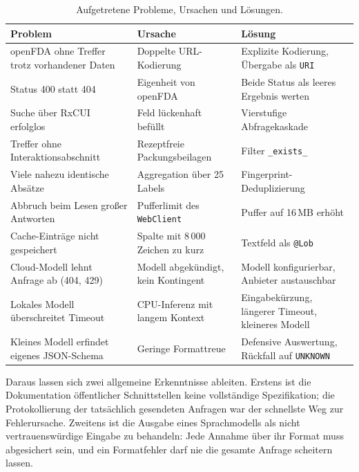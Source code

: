 \begin{table}[htbp]
  \centering
  \small
  \caption{Aufgetretene Probleme, Ursachen und Lösungen.}
  \label{tab:probleme}
  \begin{tabularx}{\textwidth}{@{}L L L@{}}
    \toprule
    Problem & Ursache & Lösung \\
    \midrule
    openFDA ohne Treffer trotz vorhandener Daten & Doppelte URL-Kodierung & Explizite Kodierung, Übergabe als \texttt{URI} \\
    Status 400 statt 404 & Eigenheit von openFDA & Beide Status als leeres Ergebnis werten \\
    Suche über RxCUI erfolglos & Feld lückenhaft befüllt & Vierstufige Abfragekaskade \\
    Treffer ohne Interaktionsabschnitt & Rezeptfreie Packungsbeilagen & Filter \texttt{\_exists\_} \\
    Viele nahezu identische Absätze & Aggregation über 25 Labels & Fingerprint-Deduplizierung \\
    Abbruch beim Lesen großer Antworten & Pufferlimit des \texttt{WebClient} & Puffer auf 16\,MB erhöht \\
    Cache-Einträge nicht gespeichert & Spalte mit 8\,000 Zeichen zu kurz & Textfeld als \texttt{@Lob} \\
    Cloud-Modell lehnt Anfrage ab (404, 429) & Modell abgekündigt, kein Kontingent & Modell konfigurierbar, Anbieter austauschbar \\
    Lokales Modell überschreitet Timeout & CPU-Inferenz mit langem Kontext & Eingabekürzung, längerer Timeout, kleineres Modell \\
    Kleines Modell erfindet eigenes JSON-Schema & Geringe Formattreue & Defensive Auswertung, Rückfall auf \texttt{UNKNOWN} \\
    \bottomrule
  \end{tabularx}
\end{table}

Daraus lassen sich zwei allgemeine Erkenntnisse ableiten. Erstens ist die Dokumentation öffentlicher Schnittstellen keine vollständige Spezifikation; die Protokollierung der tatsächlich gesendeten Anfragen war der schnellste Weg zur Fehlerursache. Zweitens ist die Ausgabe eines Sprachmodells als nicht vertrauenswürdige Eingabe zu behandeln: Jede Annahme über ihr Format muss abgesichert sein, und ein Formatfehler darf nie die gesamte Anfrage scheitern lassen.

